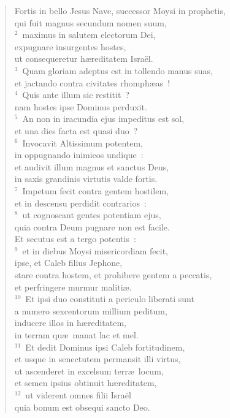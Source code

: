\begin{flushleft}\begin{verse}\vspace{-19pt}\hspace{6pt}Fortis in bello Jesus Nave, successor Moysi in prophetis,\\\hspace{6pt} qui fuit magnus secundum nomen suum,\\
${}^{2}$~maximus in salutem electorum Dei,\\ expugnare insurgentes hostes,\\ ut consequeretur h\ae reditatem Isra\"el.\\
${}^{3}$~Quam gloriam adeptus est in tollendo manus suas,\\ et jactando contra civitates rhomph\ae as~!\\
${}^{4}$~Quis ante illum sic restitit~?\\ nam hostes ipse Dominus perduxit.\\
${}^{5}$~An non in iracundia ejus impeditus est sol,\\ et una dies facta est quasi duo~?\\
${}^{6}$~Invocavit Altissimum potentem,\\ in oppugnando inimicos undique~:\\ et audivit illum magnus et sanctus Deus,\\ in saxis grandinis virtutis valde fortis.\\
${}^{7}$~Impetum fecit contra gentem hostilem,\\ et in descensu perdidit contrarios~:\\
${}^{8}$~ut cognoscant gentes potentiam ejus,\\ quia contra Deum pugnare non est facile.\\ Et secutus est a tergo potentis~:\\
${}^{9}$~et in diebus Moysi misericordiam fecit,\\ ipse, et Caleb filius Jephone,\\ stare contra hostem, et prohibere gentem a peccatis,\\ et perfringere murmur maliti\ae .\\
${}^{10}$~Et ipsi duo constituti a periculo liberati sunt\\ a numero sexcentorum millium peditum,\\ inducere illos in h\ae reditatem,\\ in terram qu\ae\ manat lac et mel.\\
${}^{11}$~Et dedit Dominus ipsi Caleb fortitudinem,\\ et usque in senectutem permansit illi virtus,\\ ut ascenderet in excelsum terr\ae\ locum,\\ et semen ipsius obtinuit h\ae reditatem,\\
${}^{12}$~ut viderent omnes filii Isra\"el\\ quia bonum est obsequi sancto Deo.\end{verse}\end{flushleft}


